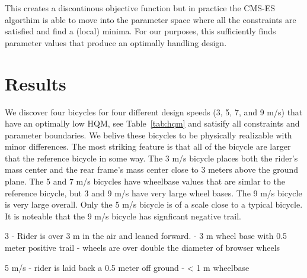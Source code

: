 \documentclass{bmd2019a}
\begin{document}
This creates a discontinous objective function but in practice the CMS-ES
algorthim is able to move into the parameter space where all the constraints
are satisfied and find a (local) minima. For our purposes, this sufficiently
finds parameter values that produce an optimally handling design.

\section{Results}
%
We discover four bicycles for four different design speeds (3, 5, 7, and 9 m/s)
that have an optimally low HQM, see Table~\ref{tab:hqm} and satisify all
constraints and parameter boundaries. We belive these bicycles to be physically
realizable with minor differences. The most striking feature is that all of the
bicycle are larger that the reference bicycle in some way.  The 3 m/s bicycle
places both the rider's mass center and the rear frame's mass center close to 3
meters above the ground plane. The 5 and 7 m/s bicycles have wheelbase values
that are simlar to the reference bicycle, but 3 and 9 m/s have very large wheel
bases. The 9 m/s bicycle is very large overall. Only the 5 m/s bicycle is of a
scale close to a typical bicycle. It is noteable that the 9 m/s bicycle has
signficant negative trail.

3
- Rider is over 3 m in the air and leaned forward.
- 3 m wheel base with 0.5 meter positive trail
- wheels are over double the diameter of browser wheels

5 m/s
- rider is laid back a 0.5 meter off ground
- < 1 m wheelbase
\end{document}
